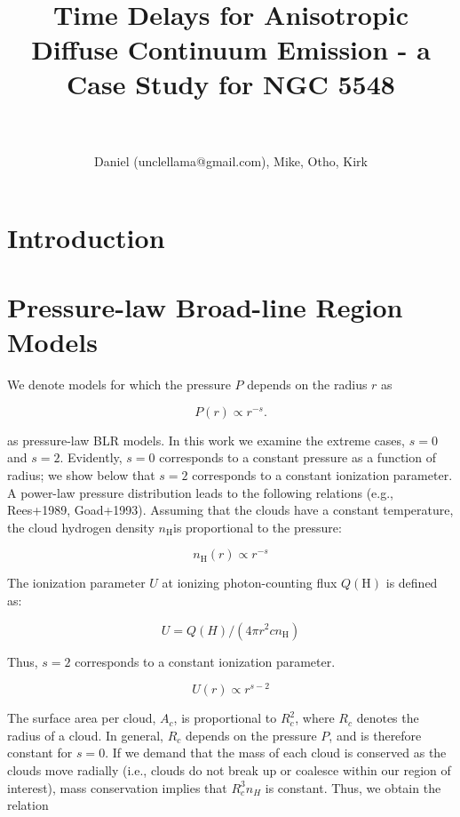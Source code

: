\documentclass[paper=a4, fontsize=11pt]{scrartcl} %
\title{	
\normalfont \normalsize 
\textsc{} \\ [25pt] %
\horrule{0.5pt} \\[0.4cm] %
\huge Time Delays for Anisotropic Diffuse Continuum Emission - a Case Study for NGC 5548\\ %
\horrule{2pt} \\[0.5cm] %
}
\author{Daniel (unclellama@gmail.com), Mike, Otho, Kirk} %
\numberwithin{equation}{section} %
\numberwithin{figure}{section} %
\numberwithin{table}{section} %
\newcommand{\nh}{\ensuremath{n_\mathrm{H}}}
\begin{document}
\date{}
\maketitle

\section{Introduction}

\section{Pressure-law Broad-line Region Models}

We denote models for which the pressure $P$ depends on the radius $r$ as

\begin{equation*}
P(r)\propto r^{-s}.
\end{equation*}

as pressure-law BLR models. In this work we examine the extreme cases, $s=0$ and $s=2$. Evidently, $s=0$ corresponds to a constant pressure as a function of radius; we show below that $s=2$ corresponds to a constant ionization parameter. A power-law pressure distribution leads to the following relations (e.g., Rees+1989, Goad+1993). Assuming that the clouds have a constant temperature, the cloud hydrogen density \nh is proportional to the pressure:

\begin{equation*}
\nh(r)\propto r^{-s}
\end{equation*}

The ionization parameter $U$ at ionizing photon-counting flux $Q(\mathrm{H})$ is defined as:

\begin{equation*}
U=Q(H)/(4\pi r^2c\nh)
\end{equation*}

Thus, $s=2$ corresponds to a constant ionization parameter.

\begin{equation*}
U(r)\propto r^{s-2}
\end{equation*}

The surface area per cloud, $A_c$, is proportional to $R_c^2$, where $R_c$ denotes the radius of a cloud. In general, $R_c$ depends on the pressure $P$, and is therefore constant for $s=0$. If we demand that the mass of each cloud is conserved as the clouds move radially (i.e., clouds do not break up or coalesce within our region of interest), mass conservation implies that $R_c^3n_H$ is constant. Thus, we obtain the relation
\end{document}
